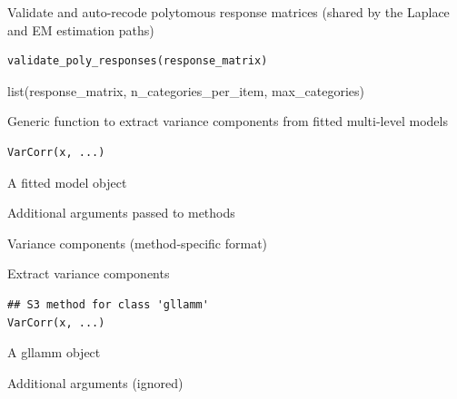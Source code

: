 \documentclass[a4paper]{book}
\begin{document}
%
\begin{Description}
Validate and auto-recode polytomous response matrices (shared by the
Laplace and EM estimation paths)
\end{Description}
%
\begin{Usage}
\begin{verbatim}
validate_poly_responses(response_matrix)
\end{verbatim}
\end{Usage}
%
\begin{Value}
list(response\_matrix, n\_categories\_per\_item, max\_categories)
\end{Value}
%
\begin{Description}
Generic function to extract variance components from fitted multi-level models
\end{Description}
%
\begin{Usage}
\begin{verbatim}
VarCorr(x, ...)
\end{verbatim}
\end{Usage}
%
\begin{Arguments}
\begin{ldescription}
\item[\code{x}] A fitted model object

\item[\code{...}] Additional arguments passed to methods
\end{ldescription}
\end{Arguments}
%
\begin{Value}
Variance components (method-specific format)
\end{Value}
%
\begin{Description}
Extract variance components
\end{Description}
%
\begin{Usage}
\begin{verbatim}
## S3 method for class 'gllamm'
VarCorr(x, ...)
\end{verbatim}
\end{Usage}
%
\begin{Arguments}
\begin{ldescription}
\item[\code{x}] A gllamm object

\item[\code{...}] Additional arguments (ignored)
\end{ldescription}
\end{Arguments}
\end{document}

